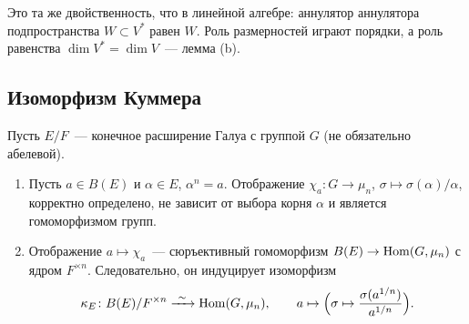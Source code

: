 Это та же двойственность, что в линейной алгебре: аннулятор аннулятора подпространства $W\subset V^*$ равен $W$. Роль
размерностей играют порядки, а роль равенства $\dim V^*=\dim V$~--- лемма (b).

\subsection*{Изоморфизм Куммера}

\begin{proposition}[5.30d]
Пусть $E/F$~--- конечное расширение Галуа с группой $G$ \textup(не обязательно абелевой\textup).
\begin{enumerate}[label=\textup{(\alph*)}]
\item Пусть $a\in B(E)$ и $\alpha\in E$, $\alpha^n=a$. Отображение $\chi_a\colon G\to\mu_n$, $\sigma\mapsto
\sigma(\alpha)/\alpha$, корректно определено, не зависит от выбора корня $\alpha$ и является гомоморфизмом групп.
\item Отображение $a\mapsto\chi_a$~--- сюръективный гомоморфизм $B(E)\to\operatorname{Hom}(G,\mu_n)$ с ядром $F^{\times n}$.
Следовательно, он индуцирует изоморфизм
\[
\kappa_E\colon B(E)/F^{\times n}\xrightarrow{\ \sim\ }\Hom(G,\mu_n),\qquad
a\mapsto\Bigl(\sigma\mapsto\frac{\sigma(a^{1/n})}{a^{1/n}}\Bigr).
\]
\end{enumerate}
\end{proposition}

